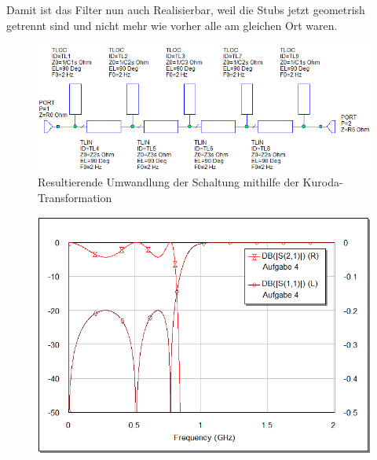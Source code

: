 Damit ist das Filter nun auch Realisierbar, weil die  Stubs  jetzt  geometrish
getrennt  sind  und  nicht  mehr  wie  vorher  alle  am  gleichen  Ort  waren.

\begin{figure}[h!]
    \centering
    \includegraphics[width=\imagewidth]{images/stripline-kuroda}
    \caption{Resultierende Umwandlung der Schaltung mithilfe der Kuroda-Transformation}
    \label{fig:stripline-kuroda}
\end{figure}

\begin{figure}[h!]
    \centering
    \includegraphics[width=\imagewidth]{images/graph-kuroda}
    \caption{}
    \label{fig:graph-kuroda}
\end{figure}

